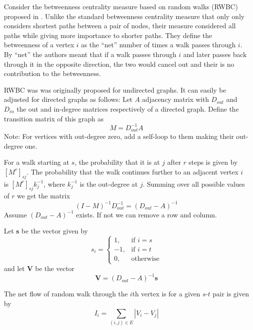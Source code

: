 \documentclass[envcountsame]{llncs}
\begin{document}
Consider the betweenness centrality measure based on random walks (RWBC) proposed in \cite{newman2005measure}. Unlike the standard betweenness centrality measure that only only considers shortest paths between a pair of nodes, their measure considered all paths while giving more importance to shorter paths.  They define the betweenness of a vertex $i$ as the ``net'' number of times a walk passes through $i$. By ``net'' the authors meant that if a walk passes through $i$ and later passes back through it in the opposite direction, the two would cancel out and their is no contribution to the betweenness. 

RWBC was was originally proposed for undirected graphs. It can easily be adjusted for directed graphs as follows: Let $A$ adjacency matrix with $D_{out}$ and $D_{in}$ the out and in-degree matrices respectively of a directed graph. Define the transition matrix of this graph as 
\begin{equation}
M = D^{-1}_{out}A
\end{equation}
Note: For vertices with out-degree zero, add a self-loop to them making their out-degree one.

For a walk starting at $s$, the probability that it is at $j$ after $r$ steps is given by $[M^r]_{sj}$. The probability that the walk continues further to an adjacent vertex $i$ is $[M^r]_{sj}k^{-1}_{j}$, where $k^{-1}_{j}$ is the out-degree at $j$. Summing over all possible values of $r$ we get the matrix
\begin{equation}
(I - M)^{-1}D^{-1}_{out} = (D_{out} - A )^{-1}
\end{equation}
Assume $(D_{out} - A )^{-1}$ exists. If not we can remove a row and column. 

Let $\textbf{s}$ be the vector given by 
\begin{equation*}
s_i = \begin{cases}
1,& \text{if } i = s\\
-1,& \text{if } i = t\\
0, &\text{otherwise}
\end{cases}
\end{equation*}
and let $\textbf{V}$ be the vector 
\begin{equation}
\textbf{V} = (D_{out}-A)^{-1}\textbf{s}
\end{equation}


    The net flow of random walk through the $i$th vertex is for a given $s$-$t$ pair is given by
    \begin{equation}
    I_i = \sum_{(i,j)\in E} |V_i - V_j|
    \end{equation}
\end{document}

